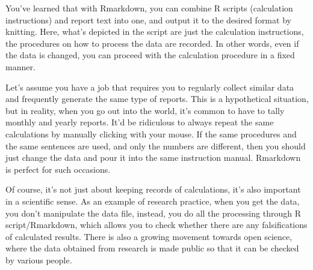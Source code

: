 \documentclass{ltjsbook}
\begin{document}
You've learned that with Rmarkdown, you can combine R scripts (calculation instructions) and report text into one, and output it to the desired format by knitting. Here, what's depicted in the script are just the calculation instructions, the procedures on how to process the data are recorded. In other words, even if the data is changed, you can proceed with the calculation procedure in a fixed manner.

Let's assume you have a job that requires you to regularly collect similar data and frequently generate the same type of reports. This is a hypothetical situation, but in reality, when you go out into the world, it's common to have to tally monthly and yearly reports. It'd be ridiculous to always repeat the same calculations by manually clicking with your mouse. If the same procedures and the same sentences are used, and only the numbers are different, then you should just change the data and pour it into the same instruction manual. Rmarkdown is perfect for such occasions.

Of course, it's not just about keeping records of calculations, it's also important in a scientific sense. As an example of research practice, when you get the data, you don't manipulate the data file, instead, you do all the processing through R script/Rmarkdown, which allows you to check whether there are any falsifications of calculated results. There is also a growing movement towards open science, where the data obtained from research is made public so that it can be checked by various people.
\end{document}
